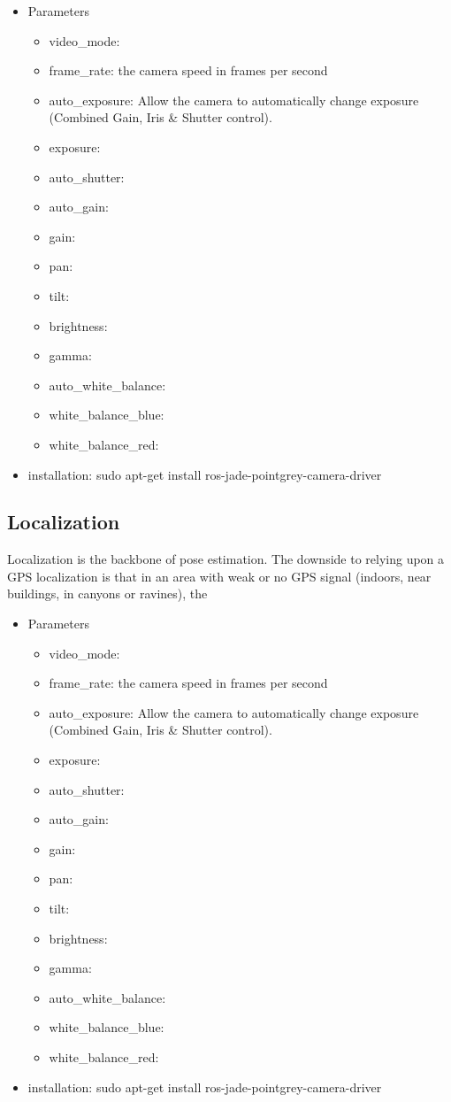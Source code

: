 \begin{itemize}
\item Parameters
\begin{itemize}
\item video\_mode:
\item frame\_rate:  the camera speed in frames per second
\item auto\_exposure:  Allow the camera to automatically change exposure (Combined Gain, Iris \& Shutter control).
\item exposure: 
\item auto\_shutter:
\item auto\_gain:
\item gain:
\item pan:
\item tilt:
\item brightness:
\item gamma:
\item auto\_white\_balance:
\item white\_balance\_blue:
\item white\_balance\_red:
\end{itemize}
\item installation: sudo apt-get install ros-jade-pointgrey-camera-driver
\end{itemize}

\subsection{Localization}
Localization is the backbone of pose estimation. The downside to relying upon a GPS localization is that in an area with weak or no GPS signal (indoors, near buildings, in canyons or ravines), the 

\begin{itemize}
\item Parameters
\begin{itemize}
\item video\_mode:
\item frame\_rate:  the camera speed in frames per second
\item auto\_exposure:  Allow the camera to automatically change exposure (Combined Gain, Iris \& Shutter control).
\item exposure: 
\item auto\_shutter:
\item auto\_gain:
\item gain:
\item pan:
\item tilt:
\item brightness:
\item gamma:
\item auto\_white\_balance:
\item white\_balance\_blue:
\item white\_balance\_red:
\end{itemize}
\item installation: sudo apt-get install ros-jade-pointgrey-camera-driver
\end{itemize}
